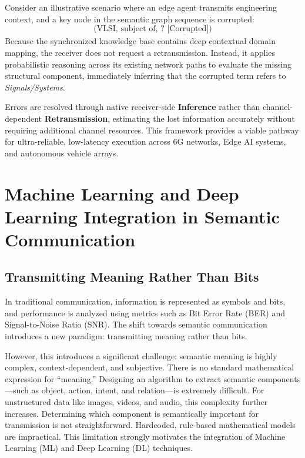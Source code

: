\documentclass[10pt, conference]{IEEEtran}
\begin{document}
Consider an illustrative scenario where an edge agent transmits engineering context, and a key node in the semantic graph sequence is corrupted:
\begin{equation}
    \big(\text{VLSI}, \, \text{subject of}, \, \underline{\text{? [Corrupted]}}\big)
\end{equation}
Because the synchronized knowledge base contains deep contextual domain mapping, the receiver does not request a retransmission. Instead, it applies probabilistic reasoning across its existing network paths to evaluate the missing structural component, immediately inferring that the corrupted term refers to \textit{Signals/Systems}. 

Errors are resolved through native receiver-side \textbf{Inference} rather than channel-dependent \textbf{Retransmission}, estimating the lost information accurately without requiring additional channel resources. This framework provides a viable pathway for ultra-reliable, low-latency execution across 6G networks, Edge AI systems, and autonomous vehicle arrays.

\section{\large \textbf{Machine Learning and Deep Learning Integration in Semantic Communication}}

\subsection{\textbf{Transmitting Meaning Rather Than Bits}}
In traditional communication, information is represented as symbols and bits, and performance is analyzed using metrics such as Bit Error Rate (BER) and Signal-to-Noise Ratio (SNR). The shift towards semantic communication introduces a new paradigm: transmitting meaning rather than bits.

However, this introduces a significant challenge: semantic meaning is highly complex, context-dependent, and subjective. There is no standard mathematical expression for ``meaning.'' Designing an algorithm to extract semantic components—such as object, action, intent, and relation—is extremely difficult. For unstructured data like images, videos, and audio, this complexity further increases. Determining which component is semantically important for transmission is not straightforward. Hardcoded, rule-based mathematical models are impractical. This limitation strongly motivates the integration of Machine Learning (ML) and Deep Learning (DL) techniques.
\end{document}
